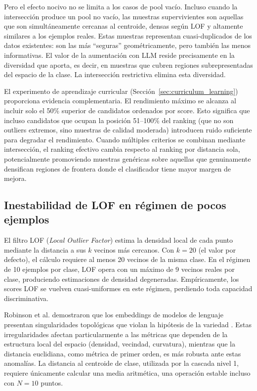 Pero el efecto nocivo no se limita a los casos de pool vacío. Incluso cuando la intersección produce un pool no vacío, las muestras supervivientes son aquellas que son simultáneamente cercanas al centroide, densas según LOF y altamente similares a los ejemplos reales. Estas muestras representan cuasi-duplicados de los datos existentes: son las más ``seguras'' geométricamente, pero también las menos informativas. El valor de la aumentación con LLM reside precisamente en la diversidad que aporta, es decir, en muestras que cubren regiones subrepresentadas del espacio de la clase. La intersección restrictiva elimina esta diversidad.

El experimento de aprendizaje curricular (Sección~\ref{sec:curriculum_learning}) proporciona evidencia complementaria. El rendimiento máximo se alcanza al incluir solo el 50\% superior de candidatos ordenados por score. Esto significa que incluso candidatos que ocupan la posición 51--100\% del ranking (que no son outliers extremos, sino muestras de calidad moderada) introducen ruido suficiente para degradar el rendimiento. Cuando múltiples criterios se combinan mediante intersección, el ranking efectivo cambia respecto al ranking por distancia sola, potencialmente promoviendo muestras genéricas sobre aquellas que genuinamente densifican regiones de frontera donde el clasificador tiene mayor margen de mejora.

\subsection{Inestabilidad de LOF en régimen de pocos ejemplos}

El filtro LOF (\textit{Local Outlier Factor}) estima la densidad local de cada punto mediante la distancia a sus $k$ vecinos más cercanos. Con $k=20$ (el valor por defecto), el cálculo requiere al menos 20 vecinos de la misma clase. En el régimen de 10 ejemplos por clase, LOF opera con un máximo de 9 vecinos reales por clase, produciendo estimaciones de densidad degeneradas. Empíricamente, los scores LOF se vuelven cuasi-uniformes en este régimen, perdiendo toda capacidad discriminativa.

Robinson et al. demostraron que los embeddings de modelos de lenguaje presentan singularidades topológicas que violan la hipótesis de la variedad \cite{robinson2025manifold}. Estas irregularidades afectan particularmente a las métricas que dependen de la estructura local del espacio (densidad, vecindad, curvatura), mientras que la distancia euclidiana, como métrica de primer orden, es más robusta ante estas anomalías. La distancia al centroide de clase, utilizada por la cascada nivel 1, requiere únicamente calcular una media aritmética, una operación estable incluso con $N=10$ puntos.

